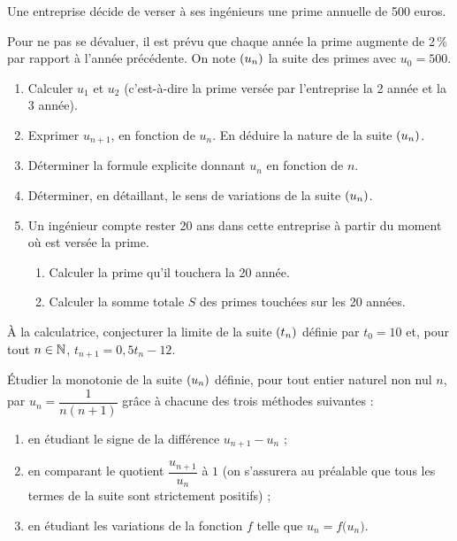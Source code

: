 \documentclass[a4paper,11pt]{article}
\begin{document}
\begin{cexercice}
Une entreprise décide de verser à ses ingénieurs une prime annuelle de 500 euros.

Pour ne pas se dévaluer, il est prévu que chaque année la prime augmente de 2\,\% par rapport à l'année précédente. On
note $\suiten$ la suite des primes avec $u_0 = 500$.
%
\begin{enumerate}
	\item Calculer $u_1$ et $u_2$ (c'est-à-dire la prime versée par l'entreprise la 2 année et la 3 année).
	\item Exprimer $u_{n+1}$, en fonction de $u_n$. En déduire la nature de la suite $\suiten$.
	\item Déterminer la formule explicite donnant $u_n$ en fonction de $n$.
	\item Déterminer, en détaillant, le sens de variations de la suite $\suiten$.
	\item Un ingénieur compte rester 20 ans dans cette entreprise à partir du moment où est versée la prime.
	\begin{enumerate}
		\item Calculer la prime qu'il touchera la 20 année.
		\item Calculer la somme totale $S$ des primes touchées sur les 20 années.
	\end{enumerate}
\end{enumerate}
\end{cexercice}

\begin{cexercice}
À la calculatrice, conjecturer la limite de la suite $\suiten[t]$ définie par $t_0 = 10$ et, pour tout $n \in \N$, $t_{n+1}=0,5t_n-12$.
\end{cexercice}

\pagebreak

\begin{cexercice}
Étudier la monotonie de la suite $\suiten$ définie, pour tout entier naturel non nul $n$, par $u_n = \dfrac{1}{n(n+1)}$ grâce à chacune des trois méthodes suivantes :
%
\begin{enumerate}
	\item en étudiant le signe de la différence $u_{n+1}-u_n$ ;
	\item en comparant le quotient $\dfrac{u_{n+1}}{u_n}$ à $1$ (on s’assurera au préalable que tous les termes de la suite sont strictement positifs) ;
	\item en étudiant les variations de la fonction $f$ telle que $u_n = f\big(u_n\big)$.
\end{enumerate}
\end{cexercice}
\end{document}
